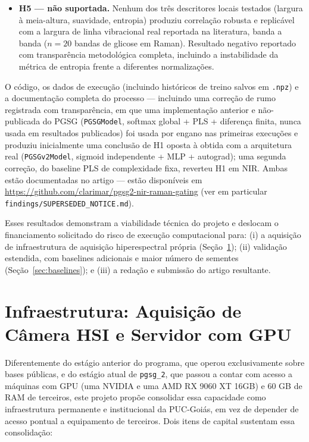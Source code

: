 \documentclass[11pt,a4paper]{article}
\begin{document}
\begin{itemize}
\item \textbf{H5 --- não suportada.} Nenhum dos três descritores locais testados (largura à meia-altura, suavidade, entropia) produziu correlação robusta e replicável com a largura de linha vibracional real reportada na literatura, banda a banda ($n=20$ bandas de glicose em Raman). Resultado negativo reportado com transparência metodológica completa, incluindo a instabilidade da métrica de entropia frente a diferentes normalizações.
\end{itemize}

O código, os dados de execução (incluindo históricos de treino salvos em \texttt{.npz}) e a documentação completa do processo --- incluindo uma correção de rumo registrada com transparência, em que uma implementação anterior e não-publicada do PGSG (\texttt{PGSGModel}, softmax global + PLS + diferença finita, nunca usada em resultados publicados) foi usada por engano nas primeiras execuções e produziu inicialmente uma conclusão de H1 oposta à obtida com a arquitetura real (\texttt{PGSGv2Model}, sigmoid independente + MLP + autograd); uma segunda correção, do baseline PLS de complexidade fixa, reverteu H1 em NIR. Ambas estão documentadas no artigo --- estão disponíveis em \url{https://github.com/clarimar/pgsg2-nir-raman-gating} (ver em particular \texttt{findings/SUPERSEDED\_NOTICE.md}).

Esses resultados demonstram a viabilidade técnica do projeto e deslocam o financiamento solicitado do risco de execução computacional para: (i) a aquisição de infraestrutura de aquisição hiperespectral própria (Seção~\ref{sec:infraestrutura}); (ii) validação estendida, com baselines adicionais e maior número de sementes (Seção~\ref{sec:baselines}); e (iii) a redação e submissão do artigo resultante.

\section{Infraestrutura: Aquisição de Câmera HSI e Servidor com GPU}
\label{sec:infraestrutura}

Diferentemente do estágio anterior do programa, que operou exclusivamente sobre bases públicas, e do estágio atual de \texttt{pgsg\_2}, que passou a contar com acesso a máquinas com GPU (uma NVIDIA e uma AMD RX 9060 XT 16GB) e 60 GB de RAM de terceiros, este projeto propõe consolidar essa capacidade como infraestrutura permanente e institucional da PUC-Goiás, em vez de depender de acesso pontual a equipamento de terceiros. Dois itens de capital sustentam essa consolidação:
\end{document}
